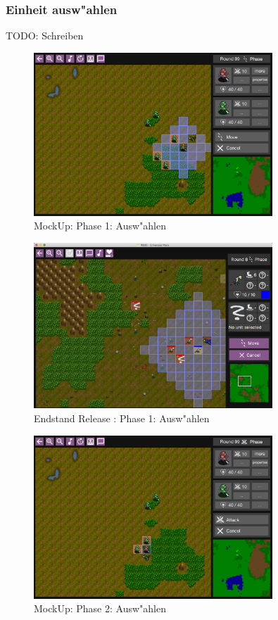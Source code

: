 \documentclass[12pt, titlepage]{scrartcl}
\newcommand{\RN}[1]{%
	\textup{\uppercase\expandafter{\romannumeral#1}}%
}
\begin{document}
			\subsubsection{Einheit ausw"ahlen}
				TODO: Schreiben
				\begin{figure}[H] 
					\centering
					\includegraphics[width=0.8\textwidth]{images/mockUps/Select.png}
					\caption{MockUp: Phase 1: Ausw"ahlen}
					\label{Select_1_2}
				\end{figure}
				\begin{figure}[H] 
					\centering
					\includegraphics[width=0.8\textwidth]{images/endOfRelease/Select.png}
					\caption{Endstand Release \RN{3}: Phase 1: Ausw"ahlen}
					\label{End_Select_1}
				\end{figure}
				\begin{figure}[H] 
					\centering
					\includegraphics[width=0.8\textwidth]{images/mockUps/Select3.png}
					\caption{MockUp: Phase 2: Ausw"ahlen}
					\label{Select_2_2}
				\end{figure}
\end{document}

